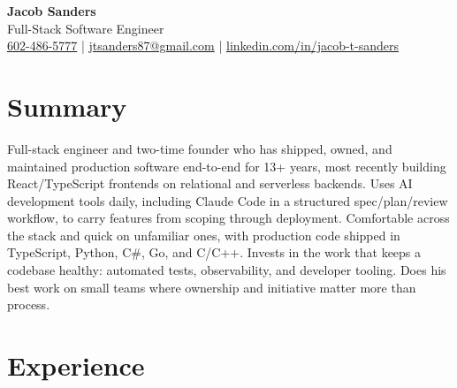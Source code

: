 \documentclass[10.5pt, letterpaper]{article}
\begin{document}
\begin{center}
  {\fontsize{28}{32}\selectfont\bfseries\color{accent} Jacob Sanders}\\[5pt]
  {\large\color{muted} Full-Stack Software Engineer}\\[8pt]
  \small
  \faPhone\enspace \href{tel:6024865777}{602-486-5777}
  \enspace\textcolor{accent}{|}\enspace
  \faEnvelope\enspace \href{mailto:jtsanders87@gmail.com}{jtsanders87@gmail.com}
  \enspace\textcolor{accent}{|}\enspace
  \faLinkedin\enspace \href{https://linkedin.com/in/jacob-t-sanders}{linkedin.com/in/jacob-t-sanders}
\end{center}

\vspace{2pt}

\section{Summary}

Full-stack engineer and two-time founder who has shipped, owned, and maintained
production software end-to-end for 13+ years, most recently building
React/TypeScript frontends on relational and serverless backends. Uses AI
development tools daily, including Claude Code in a structured spec/plan/review
workflow, to carry features from scoping through deployment. Comfortable across
the stack and quick on unfamiliar ones, with production code shipped in
TypeScript, Python, C\#, Go, and C/C++. Invests in the work that keeps a
codebase healthy: automated tests, observability, and developer tooling. Does
his best work on small teams where ownership and initiative matter more than
process.

\section{Experience}
\end{document}
